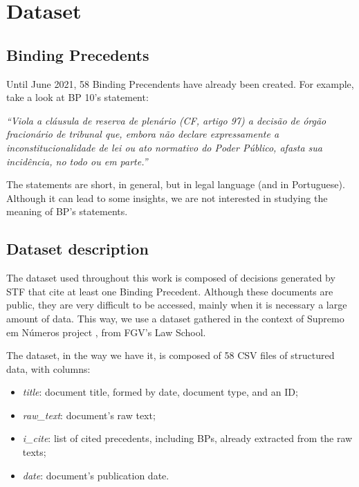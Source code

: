 \section{Dataset}
      \label{sec:dataset}

      \subsection{Binding Precedents}

            Until June 2021, 58 Binding Precendents have already been created. For example, take a look at BP 10's statement:

            \textit{``Viola a cláusula de reserva de plenário (CF, artigo 97) a decisão de órgão fracionário de tribunal que, embora não declare expressamente a inconstitucionalidade de lei ou ato normativo do Poder Público, afasta sua incidência, no todo ou em parte.''}
            
            The statements are short, in general, but in legal language (and in Portuguese). Although it can lead to some insights, we are not interested in studying the meaning of BP's statements.

      \subsection{Dataset description}

            The dataset used throughout this work is composed of decisions generated by STF that cite at least one Binding Precedent. Although these documents are public, they are very difficult to be accessed, mainly when it is necessary a large amount of data. This way, we use a dataset gathered in the context of Supremo em Números project \cite{falcao2013relatorio}, from FGV's Law School.

            The dataset, in the way we have it, is composed of 58 CSV files of structured data, with columns:
            \begin{itemize}
                  \item \textit{title}: document title, formed by date, document type, and an ID;
                  \item \textit{raw\_text}: document's raw text;
                  \item \textit{i\_cite}: list of cited precedents, including BPs, already extracted from the raw texts;
                  \item \textit{date}: document's publication date.
            \end{itemize}

